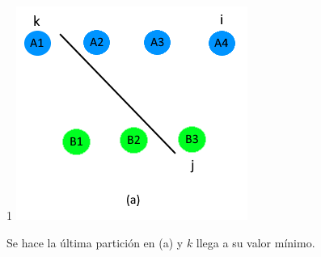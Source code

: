 \documentclass{article}
\begin{document}
    \begin{figure}[H]{1\textwidth}
    \centering
    \includegraphics[]{ada16.png}
    \caption{Se hace la última partición en (a) y $k$ llega a su valor mínimo.}
    \label{fig:sub4}
    \end{figure}
\newpage    
\end{document}
